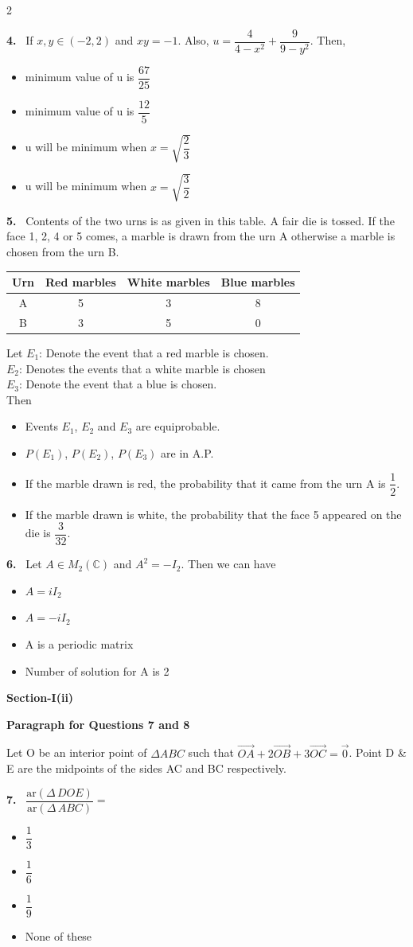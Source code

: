 \documentclass[10pt]{extarticle}
\newcommand{\sect}[1]{\par\smallskip\noindent\textbf{#1}\par}
\newcommand{\qn}[1]{\par\smallskip\noindent\textbf{#1.}~}
\newcommand{\paraq}[2]{\par\smallskip\noindent\textbf{Paragraph for Questions #1 and #2}\par}
\newenvironment{qoptions}{\begin{itemize}[leftmargin=1.8em,itemsep=1pt,topsep=2pt,label={}]}{\end{itemize}}
\newcommand{\opt}[2]{\item[(#1)] #2}
\begin{document}
\begin{multicols}{2}
\qn{4} If $x,y\in(-2,2)$ and $xy=-1$. Also, $u=\dfrac4{4-x^2}+\dfrac9{9-y^2}$. Then,
\begin{qoptions}
\opt{A}{minimum value of u is $\dfrac{67}{25}$}
\opt{B}{minimum value of u is $\dfrac{12}5$}
\opt{C}{u will be minimum when $x=\sqrt{\dfrac23}$}
\opt{D}{u will be minimum when $x=\sqrt{\dfrac32}$}
\end{qoptions}

\qn{5} Contents of the two urns is as given in this table. A fair die is tossed. If the face 1, 2, 4 or 5 comes, a marble is drawn from the urn A otherwise a marble is chosen from the urn B.\par\nobreak
\begin{center}\small
\begin{tabular}{|c|c|c|c|}
\hline
Urn & Red marbles & White marbles & Blue marbles \\
\hline
A & 5 & 3 & 8 \\
\hline
B & 3 & 5 & 0 \\
\hline
\end{tabular}
\end{center}
Let $E_1$: Denote the event that a red marble is chosen.\\
$E_2$: Denotes the events that a white marble is chosen\\
$E_3$: Denote the event that a blue is chosen.\\
Then
\begin{qoptions}
\opt{A}{Events $E_1$, $E_2$ and $E_3$ are equiprobable.}
\opt{B}{$P(E_1)$, $P(E_2)$, $P(E_3)$ are in A.P.}
\opt{C}{If the marble drawn is red, the probability that it came from the urn A is $\dfrac12$.}
\opt{D}{If the marble drawn is white, the probability that the face 5 appeared on the die is $\dfrac3{32}$.}
\end{qoptions}

\qn{6} Let $A\in M_2(\mathbb C)$ and $A^2=-I_2$. Then we can have
\begin{qoptions}
\opt{A}{$A=iI_2$}
\opt{B}{$A=-iI_2$}
\opt{C}{A is a periodic matrix}
\opt{D}{Number of solution for A is 2}
\end{qoptions}

\sect{Section-I(ii)}

\paraq{7}{8}
Let O be an interior point of $\Delta ABC$ such that $\overrightarrow{OA}+2\overrightarrow{OB}+3\overrightarrow{OC}=\vec0$. Point D \& E are the midpoints of the sides AC and BC respectively.

\qn{7} $\dfrac{\text{ar}(\Delta\,DOE)}{\text{ar}(\Delta\,ABC)}=$
\begin{qoptions}
\opt{A}{$\dfrac13$}
\opt{B}{$\dfrac16$}
\opt{C}{$\dfrac19$}
\opt{D}{None of these}
\end{qoptions}


\end{multicols}
\end{document}
